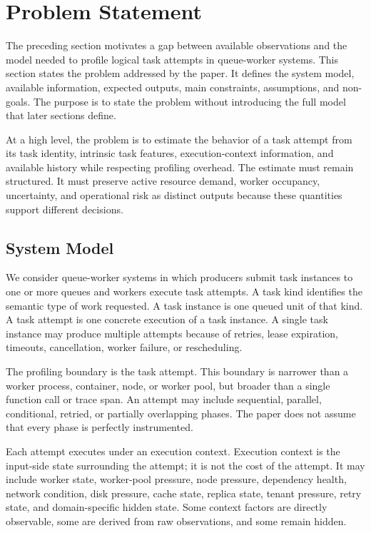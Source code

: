 \section{Problem Statement}
\label{sec:problem-statement}

The preceding section motivates a gap between available observations and the
model needed to profile logical task attempts in queue-worker systems. This
section states the problem addressed by the paper. It defines the system model,
available information, expected outputs, main constraints, assumptions, and
non-goals. The purpose is to state the problem without introducing the full model
that later sections define.

At a high level, the problem is to estimate the behavior of a task attempt from
its task identity, intrinsic task features, execution-context information, and
available history while respecting profiling overhead. The estimate must remain
structured. It must preserve active resource demand, worker occupancy,
uncertainty, and operational risk as distinct outputs because these quantities
support different decisions.

\subsection{System Model}
\label{sec:problem-system-model}

We consider queue-worker systems in which producers submit task instances to one
or more queues and workers execute task attempts. A task kind identifies the
semantic type of work requested. A task instance is one queued unit of that kind.
A task attempt is one concrete execution of a task instance. A single task
instance may produce multiple attempts because of retries, lease expiration,
timeouts, cancellation, worker failure, or rescheduling.

The profiling boundary is the task attempt. This boundary is narrower than a
worker process, container, node, or worker pool, but broader than a single
function call or trace span. An attempt may include sequential, parallel,
conditional, retried, or partially overlapping phases. The paper does not assume
that every phase is perfectly instrumented.

Each attempt executes under an execution context. Execution context is the
input-side state surrounding the attempt; it is not the cost of the attempt. It
may include worker state, worker-pool pressure, node pressure, dependency
health, network condition, disk pressure, cache state, replica state, tenant
pressure, retry state, and domain-specific hidden state. Some context factors
are directly observable, some are derived from raw observations, and some remain
hidden.


